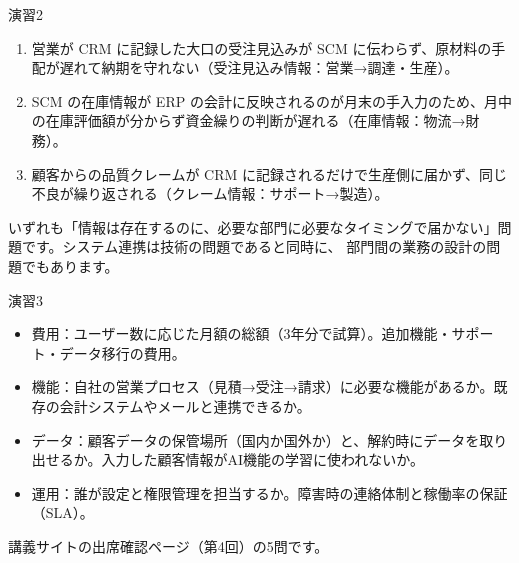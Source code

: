 \begin{answer}{演習2}
\begin{enumerate}[label=\arabic*.,leftmargin=2em]
  \item 営業が CRM に記録した大口の受注見込みが SCM に伝わらず、原材料の手配が遅れて納期を守れない（受注見込み情報：営業→調達・生産）。
  \item SCM の在庫情報が ERP の会計に反映されるのが月末の手入力のため、月中の在庫評価額が分からず資金繰りの判断が遅れる（在庫情報：物流→財務）。
  \item 顧客からの品質クレームが CRM に記録されるだけで生産側に届かず、同じ不良が繰り返される（クレーム情報：サポート→製造）。
\end{enumerate}
いずれも「情報は存在するのに、必要な部門に必要なタイミングで届かない」問題です。システム連携は技術の問題であると同時に、
部門間の業務の設計の問題でもあります。
\end{answer}

\begin{answer}{演習3}
\begin{itemize}
  \item 費用：ユーザー数に応じた月額の総額（3年分で試算）。追加機能・サポート・データ移行の費用。
  \item 機能：自社の営業プロセス（見積→受注→請求）に必要な機能があるか。既存の会計システムやメールと連携できるか。
  \item データ：顧客データの保管場所（国内か国外か）と、解約時にデータを取り出せるか。入力した顧客情報がAI機能の学習に使われないか。
  \item 運用：誰が設定と権限管理を担当するか。障害時の連絡体制と稼働率の保証（SLA）。
\end{itemize}
\end{answer}

講義サイトの出席確認ページ（第4回）の5問です。

